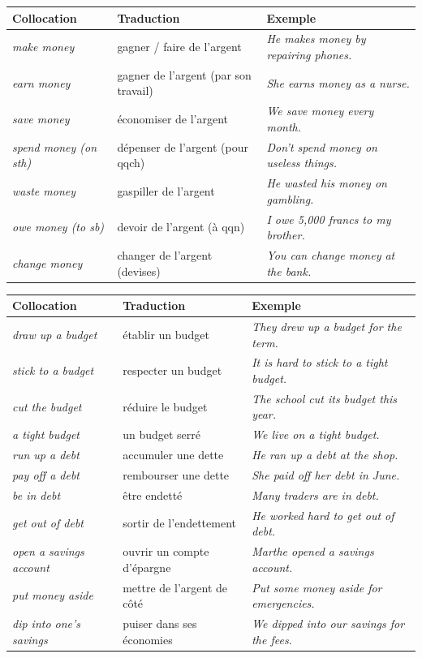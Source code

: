 \documentclass[11pt]{article}
\newcommand{\eng}[1]{\ifmmode\text{\textit{#1}}\else\begingroup\selectlanguage{english}\itshape #1\endgroup\fi}
\begin{document}
\begin{center}
\begin{tabularx}{\linewidth}{|l|X|X|}
\hline
\rowcolor{popblueL} Collocation & Traduction & Exemple \\
\hline
\eng{make money} & gagner / faire de l'argent & \eng{He makes money by repairing phones.} \\
\hline
\eng{earn money} & gagner de l'argent (par son travail) & \eng{She earns money as a nurse.} \\
\hline
\eng{save money} & économiser de l'argent & \eng{We save money every month.} \\
\hline
\eng{spend money (on sth)} & dépenser de l'argent (pour qqch) & \eng{Don't spend money on useless things.} \\
\hline
\eng{waste money} & gaspiller de l'argent & \eng{He wasted his money on gambling.} \\
\hline
\eng{owe money (to sb)} & devoir de l'argent (à qqn) & \eng{I owe 5,000 francs to my brother.} \\
\hline
\eng{change money} & changer de l'argent (devises) & \eng{You can change money at the bank.} \\
\hline
\end{tabularx}
\end{center}

\begin{center}
\begin{tabularx}{\linewidth}{|l|X|X|}
\hline
\rowcolor{popgreenL} Collocation & Traduction & Exemple \\
\hline
\eng{draw up a budget} & établir un budget & \eng{They drew up a budget for the term.} \\
\hline
\eng{stick to a budget} & respecter un budget & \eng{It is hard to stick to a tight budget.} \\
\hline
\eng{cut the budget} & réduire le budget & \eng{The school cut its budget this year.} \\
\hline
\eng{a tight budget} & un budget serré & \eng{We live on a tight budget.} \\
\hline
\eng{run up a debt} & accumuler une dette & \eng{He ran up a debt at the shop.} \\
\hline
\eng{pay off a debt} & rembourser une dette & \eng{She paid off her debt in June.} \\
\hline
\eng{be in debt} & être endetté & \eng{Many traders are in debt.} \\
\hline
\eng{get out of debt} & sortir de l'endettement & \eng{He worked hard to get out of debt.} \\
\hline
\eng{open a savings account} & ouvrir un compte d'épargne & \eng{Marthe opened a savings account.} \\
\hline
\eng{put money aside} & mettre de l'argent de côté & \eng{Put some money aside for emergencies.} \\
\hline
\eng{dip into one's savings} & puiser dans ses économies & \eng{We dipped into our savings for the fees.} \\
\hline
\end{tabularx}
\end{center}
\end{document}
